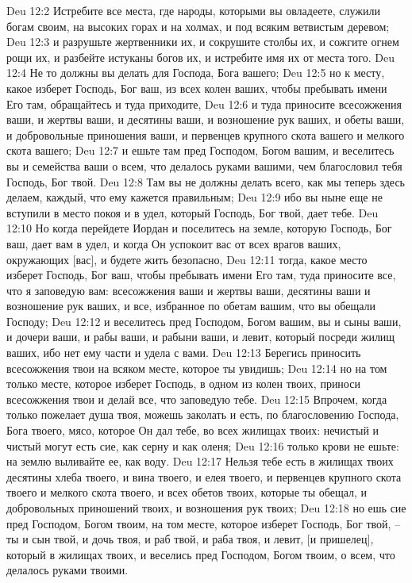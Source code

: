 Deu 12:2  Истребите все места, где народы, которыми вы овладеете, служили богам своим, на высоких горах и на холмах, и под всяким ветвистым деревом;
Deu 12:3  и разрушьте жертвенники их, и сокрушите столбы их, и сожгите огнем рощи их, и разбейте истуканы богов их, и истребите имя их от места того.
Deu 12:4  Не то должны вы делать для Господа, Бога вашего;
Deu 12:5  но к месту, какое изберет Господь, Бог ваш, из всех колен ваших, чтобы пребывать имени Его там, обращайтесь и туда приходите,
Deu 12:6  и туда приносите всесожжения ваши, и жертвы ваши, и десятины ваши, и возношение рук ваших, и обеты ваши, и добровольные приношения ваши, и первенцев крупного скота вашего и мелкого скота вашего;
Deu 12:7  и ешьте там пред Господом, Богом вашим, и веселитесь вы и семейства ваши о всем, что делалось руками вашими, чем благословил тебя Господь, Бог твой.
Deu 12:8  Там вы не должны делать всего, как мы теперь здесь делаем, каждый, что ему кажется правильным;
Deu 12:9  ибо вы ныне еще не вступили в место покоя и в удел, который Господь, Бог твой, дает тебе.
Deu 12:10  Но когда перейдете Иордан и поселитесь на земле, которую Господь, Бог ваш, дает вам в удел, и когда Он успокоит вас от всех врагов ваших, окружающих [вас], и будете жить безопасно,
Deu 12:11  тогда, какое место изберет Господь, Бог ваш, чтобы пребывать имени Его там, туда приносите все, что я заповедую вам: всесожжения ваши и жертвы ваши, десятины ваши и возношение рук ваших, и все, избранное по обетам вашим, что вы обещали Господу;
Deu 12:12  и веселитесь пред Господом, Богом вашим, вы и сыны ваши, и дочери ваши, и рабы ваши, и рабыни ваши, и левит, который посреди жилищ ваших, ибо нет ему части и удела с вами.
Deu 12:13  Берегись приносить всесожжения твои на всяком месте, которое ты увидишь;
Deu 12:14  но на том только месте, которое изберет Господь, в одном из колен твоих, приноси всесожжения твои и делай все, что заповедую тебе.
Deu 12:15  Впрочем, когда только пожелает душа твоя, можешь заколать и есть, по благословению Господа, Бога твоего, мясо, которое Он дал тебе, во всех жилищах твоих: нечистый и чистый могут есть сие, как серну и как оленя;
Deu 12:16  только крови не ешьте: на землю выливайте ее, как воду.
Deu 12:17  Нельзя тебе есть в жилищах твоих десятины хлеба твоего, и вина твоего, и елея твоего, и первенцев крупного скота твоего и мелкого скота твоего, и всех обетов твоих, которые ты обещал, и добровольных приношений твоих, и возношения рук твоих;
Deu 12:18  но ешь сие пред Господом, Богом твоим, на том месте, которое изберет Господь, Бог твой, --ты и сын твой, и дочь твоя, и раб твой, и раба твоя, и левит, [и пришелец], который в жилищах твоих, и веселись пред Господом, Богом твоим, о всем, что делалось руками твоими.
